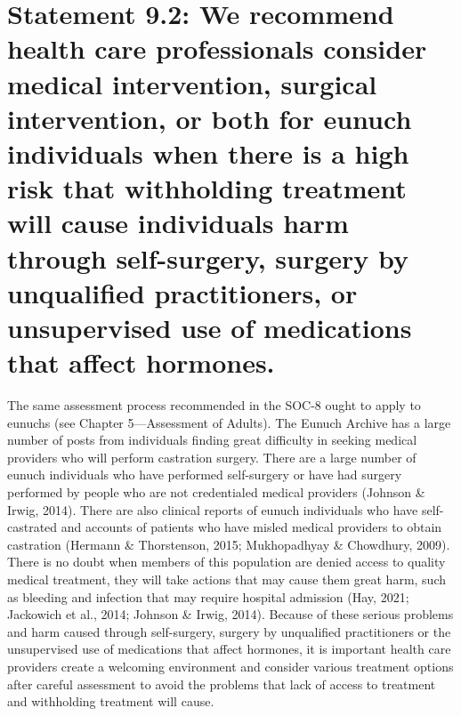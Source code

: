 \documentclass[
]{book}
\begin{document}
\hypertarget{statement-9.2-we-recommend-health-care-professionals-consider-medical-intervention-surgical-intervention-or-both-for-eunuch-individuals-when-there-is-a-high-risk-that-withholding-treatment-will-cause-individuals-harm-through-self-surgery-surgery-by-unqualified-practitioners-or-unsupervised-use-of-medications-that-affect-hormones.}{%
\section*{Statement 9.2: We recommend health care professionals consider medical intervention, surgical intervention, or both for eunuch individuals when there is a high risk that withholding treatment will cause individuals harm through self-surgery, surgery by unqualified practitioners, or unsupervised use of medications that affect hormones.}\label{statement-9.2-we-recommend-health-care-professionals-consider-medical-intervention-surgical-intervention-or-both-for-eunuch-individuals-when-there-is-a-high-risk-that-withholding-treatment-will-cause-individuals-harm-through-self-surgery-surgery-by-unqualified-practitioners-or-unsupervised-use-of-medications-that-affect-hormones.}}

The same assessment process recommended in
the SOC-8 ought to apply to eunuchs (see Chapter
5---Assessment of Adults). The Eunuch Archive
has a large number of posts from individuals
finding great difficulty in seeking medical providers who will perform castration surgery. There
are a large number of eunuch individuals who
have performed self-surgery or have had surgery
performed by people who are not credentialed
medical providers (Johnson \& Irwig, 2014). There
are also clinical reports of eunuch individuals
who have self-castrated and accounts of patients
who have misled medical providers to obtain castration (Hermann \& Thorstenson, 2015;
Mukhopadhyay \& Chowdhury, 2009). There is
no doubt when members of this population are
denied access to quality medical treatment, they
will take actions that may cause them great harm,
such as bleeding and infection that may require
hospital admission (Hay, 2021; Jackowich et al.,
2014; Johnson \& Irwig, 2014). Because of these
serious problems and harm caused through
self-surgery, surgery by unqualified practitioners
or the unsupervised use of medications that affect
hormones, it is important health care providers
create a welcoming environment and consider
various treatment options after careful assessment
to avoid the problems that lack of access to treatment and withholding treatment will cause.
\end{document}
